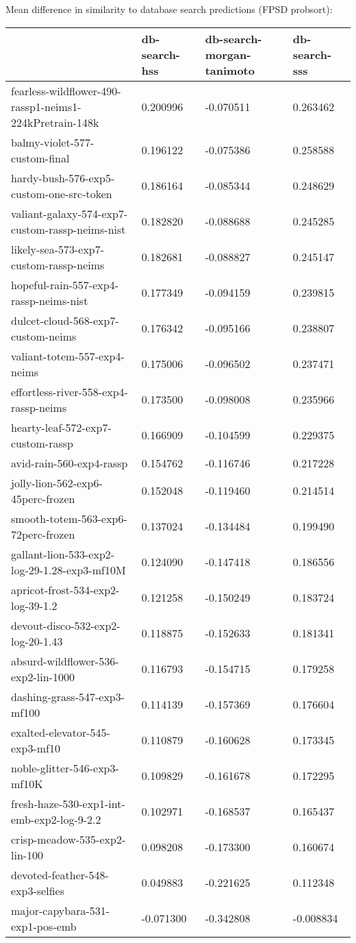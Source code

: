 Mean difference in similarity to database search predictions (FPSD probsort):
\begin{tabular}{llll}
\toprule
 & db-search-hss & db-search-morgan-tanimoto & db-search-sss \\
\midrule
fearless-wildflower-490-rassp1-neims1-224kPretrain-148k & 0.200996 & -0.070511 & 0.263462 \\
balmy-violet-577-custom-final & 0.196122 & -0.075386 & 0.258588 \\
hardy-bush-576-exp5-custom-one-src-token & 0.186164 & -0.085344 & 0.248629 \\
valiant-galaxy-574-exp7-custom-rassp-neims-nist & 0.182820 & -0.088688 & 0.245285 \\
likely-sea-573-exp7-custom-rassp-neims & 0.182681 & -0.088827 & 0.245147 \\
hopeful-rain-557-exp4-rassp-neims-nist & 0.177349 & -0.094159 & 0.239815 \\
dulcet-cloud-568-exp7-custom-neims & 0.176342 & -0.095166 & 0.238807 \\
valiant-totem-557-exp4-neims & 0.175006 & -0.096502 & 0.237471 \\
effortless-river-558-exp4-rassp-neims & 0.173500 & -0.098008 & 0.235966 \\
hearty-leaf-572-exp7-custom-rassp & 0.166909 & -0.104599 & 0.229375 \\
avid-rain-560-exp4-rassp & 0.154762 & -0.116746 & 0.217228 \\
jolly-lion-562-exp6-45perc-frozen & 0.152048 & -0.119460 & 0.214514 \\
smooth-totem-563-exp6-72perc-frozen & 0.137024 & -0.134484 & 0.199490 \\
gallant-lion-533-exp2-log-29-1.28-exp3-mf10M & 0.124090 & -0.147418 & 0.186556 \\
apricot-frost-534-exp2-log-39-1.2 & 0.121258 & -0.150249 & 0.183724 \\
devout-disco-532-exp2-log-20-1.43 & 0.118875 & -0.152633 & 0.181341 \\
absurd-wildflower-536-exp2-lin-1000 & 0.116793 & -0.154715 & 0.179258 \\
dashing-grass-547-exp3-mf100 & 0.114139 & -0.157369 & 0.176604 \\
exalted-elevator-545-exp3-mf10 & 0.110879 & -0.160628 & 0.173345 \\
noble-glitter-546-exp3-mf10K & 0.109829 & -0.161678 & 0.172295 \\
fresh-haze-530-exp1-int-emb-exp2-log-9-2.2 & 0.102971 & -0.168537 & 0.165437 \\
crisp-meadow-535-exp2-lin-100 & 0.098208 & -0.173300 & 0.160674 \\
devoted-feather-548-exp3-selfies & 0.049883 & -0.221625 & 0.112348 \\
major-capybara-531-exp1-pos-emb & -0.071300 & -0.342808 & -0.008834 \\
\bottomrule
\end{tabular}



